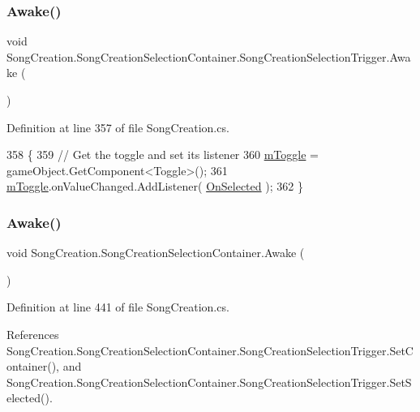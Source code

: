 \subsubsection{\texorpdfstring{Awake()}{Awake()}\hspace{0.1cm}{\footnotesize\ttfamily [2/3]}}
{\footnotesize\ttfamily void Song\+Creation.\+Song\+Creation\+Selection\+Container.\+Song\+Creation\+Selection\+Trigger.\+Awake (\begin{DoxyParamCaption}{ }\end{DoxyParamCaption})\hspace{0.3cm}{\ttfamily [private]}}



Definition at line 357 of file Song\+Creation.\+cs.


\begin{DoxyCode}
358             \{
359                 \textcolor{comment}{// Get the toggle and set its listener}
360                 \hyperlink{group___s_c_handlers_gaffc6248c907c4357b0a0a30b86635f3a}{mToggle} = gameObject.GetComponent<Toggle>();
361                 \hyperlink{group___s_c_handlers_gaffc6248c907c4357b0a0a30b86635f3a}{mToggle}.onValueChanged.AddListener( \hyperlink{group___s_c_handlers_ga33e6eb8e123cb32f40c2c06149a31087}{OnSelected} );
362             \}
\end{DoxyCode}
\mbox{\label{group___s_c_handlers_ga79e6f3c7cb63cad55eb9fa99c8698012}} 
\subsubsection{\texorpdfstring{Awake()}{Awake()}\hspace{0.1cm}{\footnotesize\ttfamily [3/3]}}
{\footnotesize\ttfamily void Song\+Creation.\+Song\+Creation\+Selection\+Container.\+Awake (\begin{DoxyParamCaption}{ }\end{DoxyParamCaption})\hspace{0.3cm}{\ttfamily [private]}}



Definition at line 441 of file Song\+Creation.\+cs.



References Song\+Creation.\+Song\+Creation\+Selection\+Container.\+Song\+Creation\+Selection\+Trigger.\+Set\+Container(), and Song\+Creation.\+Song\+Creation\+Selection\+Container.\+Song\+Creation\+Selection\+Trigger.\+Set\+Selected().


